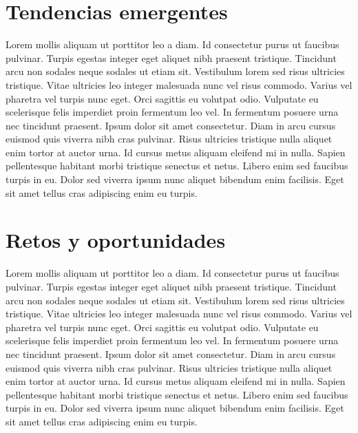 \section{Tendencias emergentes}
Lorem mollis aliquam ut porttitor leo a diam. Id consectetur purus ut faucibus pulvinar. Turpis egestas integer eget aliquet nibh praesent tristique. Tincidunt arcu non sodales neque sodales ut etiam sit. Vestibulum lorem sed risus ultricies tristique. Vitae ultricies leo integer malesuada nunc vel risus commodo. Varius vel pharetra vel turpis nunc eget. Orci sagittis eu volutpat odio. Vulputate eu scelerisque felis imperdiet proin fermentum leo vel. In fermentum posuere urna nec tincidunt praesent. Ipsum dolor sit amet consectetur. Diam in arcu cursus euismod quis viverra nibh cras pulvinar. Risus ultricies tristique nulla aliquet enim tortor at auctor urna. Id cursus metus aliquam eleifend mi in nulla. Sapien pellentesque habitant morbi tristique senectus et netus. Libero enim sed faucibus turpis in eu. Dolor sed viverra ipsum nunc aliquet bibendum enim facilisis. Eget sit amet tellus cras adipiscing enim eu turpis.

\section{Retos y oportunidades}
Lorem mollis aliquam ut porttitor leo a diam. Id consectetur purus ut faucibus pulvinar. Turpis egestas integer eget aliquet nibh praesent tristique. Tincidunt arcu non sodales neque sodales ut etiam sit. Vestibulum lorem sed risus ultricies tristique. Vitae ultricies leo integer malesuada nunc vel risus commodo. Varius vel pharetra vel turpis nunc eget. Orci sagittis eu volutpat odio. Vulputate eu scelerisque felis imperdiet proin fermentum leo vel. In fermentum posuere urna nec tincidunt praesent. Ipsum dolor sit amet consectetur. Diam in arcu cursus euismod quis viverra nibh cras pulvinar. Risus ultricies tristique nulla aliquet enim tortor at auctor urna. Id cursus metus aliquam eleifend mi in nulla. Sapien pellentesque habitant morbi tristique senectus et netus. Libero enim sed faucibus turpis in eu. Dolor sed viverra ipsum nunc aliquet bibendum enim facilisis. Eget sit amet tellus cras adipiscing enim eu turpis.


